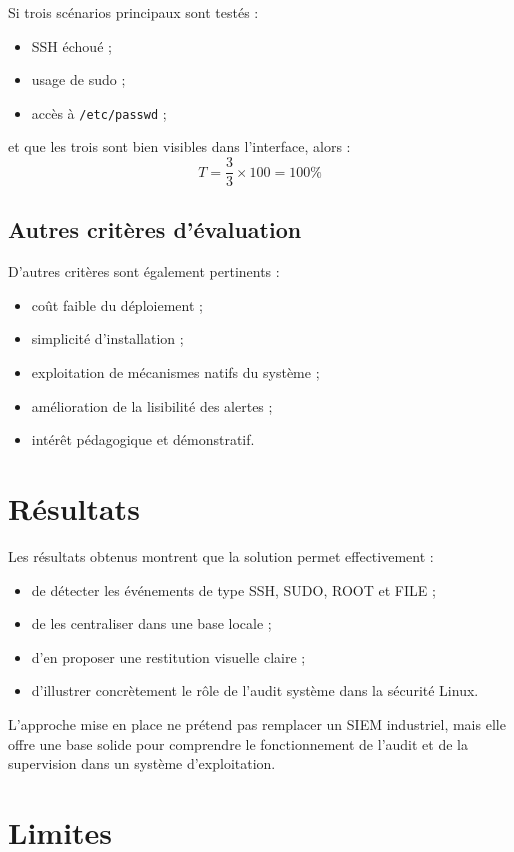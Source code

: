\documentclass[12pt,a4paper]{article}
\begin{document}
Si trois scénarios principaux sont testés :
\begin{itemize}
    \item SSH échoué ;
    \item usage de sudo ;
    \item accès à \texttt{/etc/passwd} ;
\end{itemize}
et que les trois sont bien visibles dans l’interface, alors :
\[
T = \frac{3}{3} \times 100 = 100\%
\]

\subsection{Autres critères d’évaluation}

D’autres critères sont également pertinents :
\begin{itemize}
    \item coût faible du déploiement ;
    \item simplicité d’installation ;
    \item exploitation de mécanismes natifs du système ;
    \item amélioration de la lisibilité des alertes ;
    \item intérêt pédagogique et démonstratif.
\end{itemize}

\section{Résultats}

Les résultats obtenus montrent que la solution permet effectivement :
\begin{itemize}
    \item de détecter les événements de type SSH, SUDO, ROOT et FILE ;
    \item de les centraliser dans une base locale ;
    \item d’en proposer une restitution visuelle claire ;
    \item d’illustrer concrètement le rôle de l’audit système dans la sécurité Linux.
\end{itemize}

L’approche mise en place ne prétend pas remplacer un SIEM industriel, mais elle offre une base solide pour comprendre le fonctionnement de l’audit et de la supervision dans un système d’exploitation.

\section{Limites}
\end{document}
